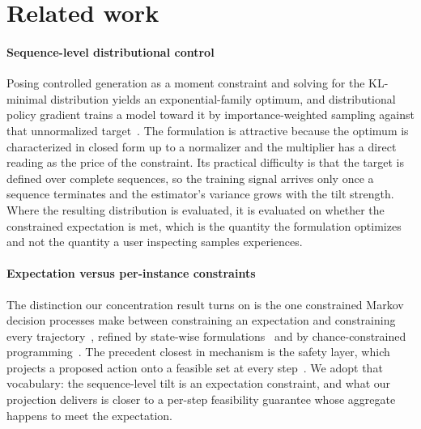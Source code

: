 \section{Related work}
\label{sec:related}

\paragraph{Sequence-level distributional control}
Posing controlled generation as a moment constraint and solving for the KL-minimal
distribution yields an exponential-family optimum, and distributional policy gradient
trains a model toward it by importance-weighted sampling against that unnormalized
target~\citep{khalifa2021distributional}. The formulation is attractive because the optimum
is characterized in closed form up to a normalizer and the multiplier has a direct reading
as the price of the constraint. Its practical difficulty is that the target is defined over
complete sequences, so the training signal arrives only once a sequence terminates and the
estimator's variance grows with the tilt strength. Where the resulting distribution is
evaluated, it is evaluated on whether the constrained expectation is met, which is the
quantity the formulation optimizes and not the quantity a user inspecting samples
experiences.

\paragraph{Expectation versus per-instance constraints}
The distinction our concentration result turns on is the one constrained Markov
decision processes make between constraining an expectation and constraining every
trajectory~\citep{altman1999cmdp}, refined by state-wise
formulations~\citep{zhao2023scpo} and by chance-constrained
programming~\citep{charnes1959chance}. The precedent closest in mechanism is the safety
layer, which projects a proposed action onto a feasible set at every
step~\citep{pham2018optlayer}. We adopt that vocabulary: the sequence-level tilt is an
expectation constraint, and what our projection delivers is closer to a per-step
feasibility guarantee whose aggregate happens to meet the expectation.

